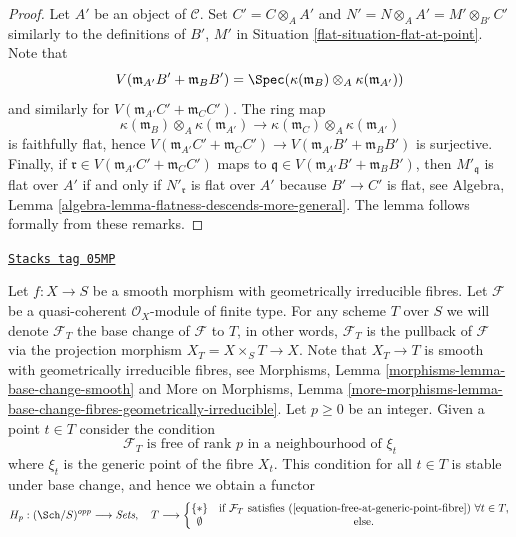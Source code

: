 \begin{proof}

Let $A'$ be an object of $\mathcal{C}$. Set $C' = C \otimes_A A'$
and $N' = N \otimes_A A' = M' \otimes_{B'} C'$ similarly to the definitions
of $B'$, $M'$ in
Situation \ref{flat-situation-flat-at-point}. Note that
$$
V(\mathfrak m_{A'}B' + \mathfrak m_B B')
=
\Spec( \kappa(\mathfrak m_B) \otimes_A \kappa(\mathfrak m_{A'}) )
$$
and similarly for $V(\mathfrak m_{A'}C' + \mathfrak m_C C')$.
The ring map
$$
\kappa(\mathfrak m_B) \otimes_A \kappa(\mathfrak m_{A'})
\longrightarrow
\kappa(\mathfrak m_C) \otimes_A \kappa(\mathfrak m_{A'})
$$
is faithfully flat, hence
$V(\mathfrak m_{A'}C' + \mathfrak m_C C') \to
V(\mathfrak m_{A'}B' + \mathfrak m_B B')$ is surjective.
Finally, if $\mathfrak r \in V(\mathfrak m_{A'}C' + \mathfrak m_C C')$
maps to $\mathfrak q \in V(\mathfrak m_{A'}B' + \mathfrak m_B B')$, then
$M'_{\mathfrak q}$ is flat over $A'$ if and only if
$N'_{\mathfrak r}$ is flat over $A'$ because $B' \to C'$ is flat, see
Algebra, Lemma \ref{algebra-lemma-flatness-descends-more-general}.
The lemma follows formally from these remarks.
\end{proof}

\begin{definition}
\label{flat-situation-free-at-generic-points}
\href{https://stacks.math.columbia.edu/tag/05MP}{\texttt{Stacks tag 05MP}}

Let $f : X \to S$ be a smooth morphism with geometrically irreducible
fibres. Let $\mathcal{F}$ be a quasi-coherent $\mathcal{O}_X$-module of
finite type. For any scheme $T$ over $S$ we will denote
$\mathcal{F}_T$ the base change of $\mathcal{F}$ to $T$, in other
words, $\mathcal{F}_T$ is the pullback of $\mathcal{F}$ via the
projection morphism $X_T = X \times_S T \to X$. Note that $X_T \to T$
is smooth with geometrically irreducible fibres, see
Morphisms, Lemma \ref{morphisms-lemma-base-change-smooth} and
More on Morphisms,
Lemma \ref{more-morphisms-lemma-base-change-fibres-geometrically-irreducible}.
Let $p \geq 0$ be an integer. Given a point $t \in T$ consider the
condition
\begin{equation}
\label{equation-free-at-generic-point-fibre}
\mathcal{F}_T \text{ is free of rank }p\text{ in a neighbourhood of }\xi_t
\end{equation}
where $\xi_t$ is the generic point of the fibre $X_t$. This condition
for all $t \in T$ is stable under base change, and hence we obtain a functor
\begin{equation}
\label{equation-free-at-generic-points}
H_p : (\Sch/S)^{opp} \longrightarrow \textit{Sets}, \quad
T \longrightarrow \left\{
\begin{matrix}
\{*\} & \text{if }\mathcal{F}_T\text{ satisfies
(\ref{equation-free-at-generic-point-fibre}) }\forall t\in T, \\
\emptyset & \text{else.}
\end{matrix}
\right.
\end{equation}
\end{definition}

